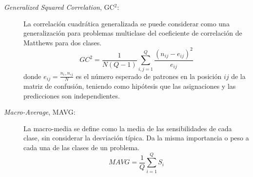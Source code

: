 \begin{description}
	\item[\textit{Generalized Squared Correlation}, GC$^{2}$:] La correlación
	cuadrática generalizada se puede considerar como una generalización para problemas
	multiclase del coeficiente de correlación de Matthews \cite{Matthew1975} para dos
	clases.
	\begin{displaymath}
	GC^2=\frac{1}{N\left(Q-1\right)}\sum_{i,j=1}^Q\frac{\left(
	n_{ij}-e_{ij}\right)^2}{e_{ij}}
	\end{displaymath}
	donde $\displaystyle e_{ij}=\frac{n_{i\circ}n_{\circ j}}{N}$	es el número esperado de
patrones en
	la posición	$ij$ de la matriz de confusión, teniendo como hipótesis que las asignaciones
	y	las	predicciones son independientes.
	\item[\textit{Macro-Average}, MAVG:] La macro-media se define como la media de las
	sensibilidades de cada clase, sin considerar la desviación típica. Da la misma
	importancia o peso a cada una de las clases de un problema.
	\begin{displaymath}
	MAVG=\frac{1}{Q}\sum_{i=1}^Q S_{i}
	\end{displaymath}
\end{description}
\newpage
